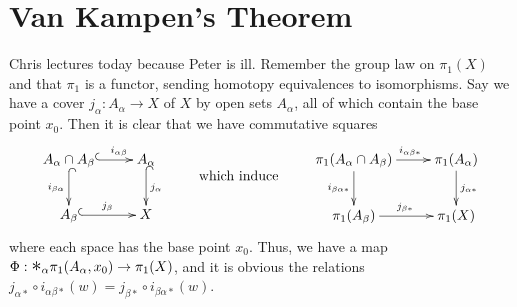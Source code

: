 \documentclass[12pt]{article}
\theoremstyle{plain}
\theoremstyle{definition}
\theoremstyle{remark}
\newcommand{\bigast}{\text{\Large $\ast$}}
\begin{document}
 \section{Van Kampen's Theorem}
 Chris lectures today because Peter is ill. Remember the group law on $\pi_1(X)$ and
 that $\pi_1$ is a functor, sending homotopy equivalences to isomorphisms. Say we have a
 cover $j_\alpha:A_\alpha\to X$ of $X$ by open sets $A_\alpha$, all of which contain the
 base point $x_0$. Then it is clear that we have commutative squares
 \[
 \xymatrix{
  A_\alpha\cap A_\beta \ar@{^(->}[r]^(.65){i_{\alpha\beta}} \ar@{^(->}[d]_{i_{\beta\alpha}} &
  A_\alpha \ar@{^(->}[d]^{j_\alpha}\\
  A_\beta \ar@{^(->}[r]^{j_\beta} & X
 }\qquad\raisebox{-1pc}{\text{ which induce }}\qquad \xymatrix{
  \pi_1(A_\alpha\cap A_\beta) \ar[r]^(.55){i_{\alpha\beta *}}
  \ar[d]_{i_{\beta\alpha *}} & \pi_1(A_\alpha) \ar[d]^{j_{\alpha *}}\\
  \pi_1(A_\beta) \ar[r]^{j_{\beta *}} & \pi_1(X)
 }\]
 where each space has the base point $x_0$. Thus, we have a map $\Phi:\bigast_\alpha
 \pi_1(A_\alpha,x_0) \to \pi_1(X)$, and it is obvious the relations
 $j_{\alpha *}\circ i_{\alpha \beta *} (w) = j_{\beta *} \circ i_{\beta \alpha *} (w)$.
\end{document}
